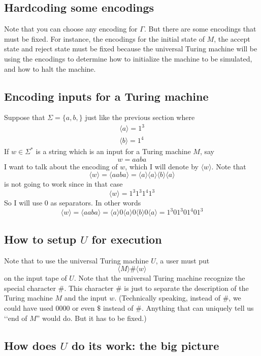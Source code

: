 \subsection{Hardcoding some encodings}

Note that you can choose any encoding for $\Gamma$.
But there are some encodings that must be fixed.
For instance, the encodings for the initial state of $M$,
the accept state and reject state must be fixed because
the universal Turing machine will be using the encodings
to determine how to initialize the machine to be simulated,
and how to halt the machine.

\subsection{Encoding inputs for a Turing machine}

Suppose that $\Sigma = \{a, b, \}$ just like the previous section
where
\begin{align*}
\langle a \rangle = 1^3 \\
\langle b \rangle = 1^4 
\end{align*}
If $w \in \Sigma^*$ is a string which is an input for
a Turing machine $M$, say
\[
w = aaba
\]
I want to talk about the encoding of $w$, which I will
denote by $\langle w \rangle$.
Note that
\[
\langle w \rangle =
\langle aaba \rangle =
\langle a \rangle 
\langle a \rangle 
\langle b \rangle 
\langle a \rangle 
\]
is not going to work since in that case
\[
\langle w \rangle =
1^3 1^3 1^4 1^3
\]
So I will use 0 as separators.
In other words
\[
\langle w \rangle =
\langle aaba \rangle =
\langle a \rangle 0
\langle a \rangle 0
\langle b \rangle 0
\langle a \rangle
=
1^3 0 1^3 0 1^4 0 1^3
\]

\subsection{How to setup $U$ for execution}

Note that to use the universal Turing machine $U$, a user must put
\[
\langle M \rangle \#
\langle w \rangle 
\]
on the input tape of $U$.
Note that the universal Turing machine recognize the
special character $\#$.
This character $\#$ is just to separate the description
of the Turing machine $M$
and the input $w$.
(Technically speaking, instead of $\#$, 
we could have used $0000$ or even $\$ $ instead of $\#$.
Anything that can uniquely tell us \lq\lq end of $M$'' would do.
But it has to be fixed.)


\subsection{How does $U$ do its work: the big picture}

